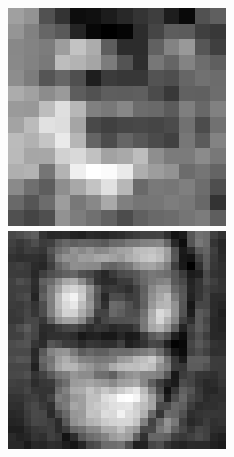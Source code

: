 \begin{figure}[H]
\endminipage\hfill
{}%
  \includegraphics[width=\linewidth]{imgs/middle2.png}
\endminipage\hfill
{}%
  \includegraphics[width=\linewidth]{imgs/up1.png}

\end{figure}
